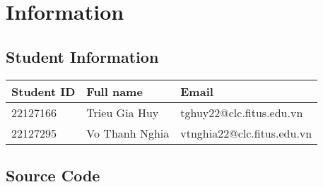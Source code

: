 \section{Information}
\subsection{Student Information}
\renewcommand{\arraystretch}{2}

\begin{center}
\begin{tabular}{|>{\centering\arraybackslash}m{4cm}|>{\centering\arraybackslash}m{5cm}|>{\centering\arraybackslash}m{7cm}|}
  \hline
  \textbf{\Large Student ID} & \textbf{\Large Full name} & \textbf{\Large Email} \\
  \hline
  \Large 22127166 & \Large Trieu Gia Huy & \Large tghuy22@clc.fitus.edu.vn
  \\
  \hline
  \Large 22127295 & \Large Vo Thanh Nghia & \Large vtnghia22@clc.fitus.edu.vn \\
  \hline
\end{tabular}
\end{center}

\subsection{Source Code}

